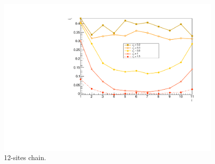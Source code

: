 \begin{figure}[H]
    \centering
    \includegraphics[scale=0.7]{Figures/12sites_spinCurrVSJz.pdf}
    \caption{12-sites chain.}
    \label{fig:my_label}
\end{figure}



